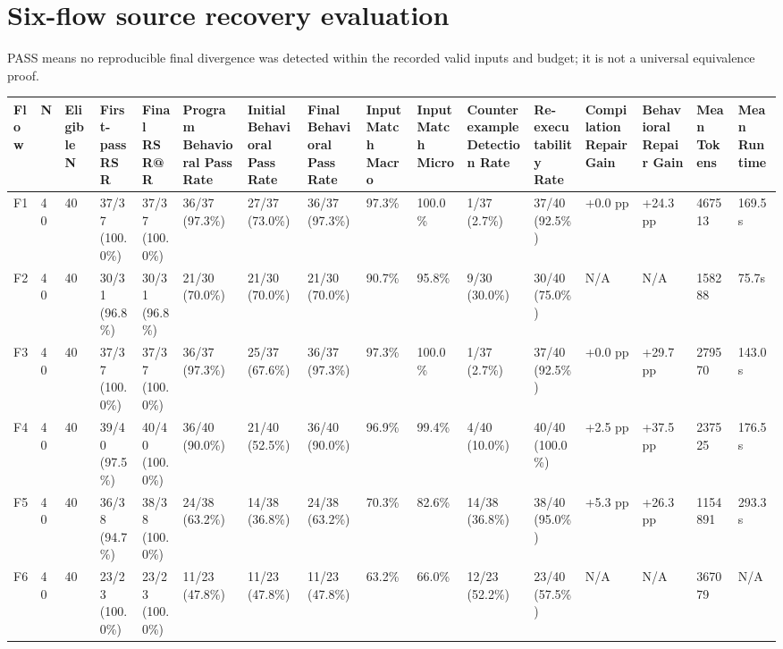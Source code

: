 \documentclass{article}
\begin{document}
\section*{Six-flow source recovery evaluation}
PASS means no reproducible final divergence was detected within the recorded valid inputs and budget; it is not a universal equivalence proof.
\begin{longtable}{llllllllllllllll}
Flow & N & Eligible N & First-pass RSR & Final RSR@R & Program Behavioral Pass Rate & Initial Behavioral Pass Rate & Final Behavioral Pass Rate & Input Match Macro & Input Match Micro & Counterexample Detection Rate & Re-executability Rate & Compilation Repair Gain & Behavioral Repair Gain & Mean Tokens & Mean Runtime \\ \hline
F1 & 40 & 40 & 37/37 (100.0\%) & 37/37 (100.0\%) & 36/37 (97.3\%) & 27/37 (73.0\%) & 36/37 (97.3\%) & 97.3\% & 100.0\% & 1/37 (2.7\%) & 37/40 (92.5\%) & +0.0 pp & +24.3 pp & 467513 & 169.5s \\
F2 & 40 & 40 & 30/31 (96.8\%) & 30/31 (96.8\%) & 21/30 (70.0\%) & 21/30 (70.0\%) & 21/30 (70.0\%) & 90.7\% & 95.8\% & 9/30 (30.0\%) & 30/40 (75.0\%) & N/A & N/A & 158288 & 75.7s \\
F3 & 40 & 40 & 37/37 (100.0\%) & 37/37 (100.0\%) & 36/37 (97.3\%) & 25/37 (67.6\%) & 36/37 (97.3\%) & 97.3\% & 100.0\% & 1/37 (2.7\%) & 37/40 (92.5\%) & +0.0 pp & +29.7 pp & 279570 & 143.0s \\
F4 & 40 & 40 & 39/40 (97.5\%) & 40/40 (100.0\%) & 36/40 (90.0\%) & 21/40 (52.5\%) & 36/40 (90.0\%) & 96.9\% & 99.4\% & 4/40 (10.0\%) & 40/40 (100.0\%) & +2.5 pp & +37.5 pp & 237525 & 176.5s \\
F5 & 40 & 40 & 36/38 (94.7\%) & 38/38 (100.0\%) & 24/38 (63.2\%) & 14/38 (36.8\%) & 24/38 (63.2\%) & 70.3\% & 82.6\% & 14/38 (36.8\%) & 38/40 (95.0\%) & +5.3 pp & +26.3 pp & 1154891 & 293.3s \\
F6 & 40 & 40 & 23/23 (100.0\%) & 23/23 (100.0\%) & 11/23 (47.8\%) & 11/23 (47.8\%) & 11/23 (47.8\%) & 63.2\% & 66.0\% & 12/23 (52.2\%) & 23/40 (57.5\%) & N/A & N/A & 367079 & N/A \\
\end{longtable}
\end{document}
